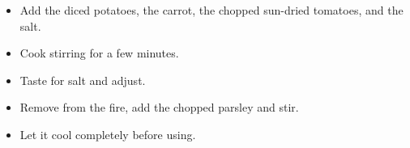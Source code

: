 \documentclass[11pt,letterpaper]{article}
\newcommand \fileName {VeganFilling}
\begin{document}
\begin{description}
\begin{enumerate}
\begin{itemize}
        \item Add the diced potatoes, the carrot, the chopped sun-dried tomatoes, and the salt.
        \item Cook stirring for a few minutes. 
        \item Taste for salt and adjust.
        \item Remove from the fire, add the chopped parsley and stir.
        \item Let it cool completely before using.
        \end{itemize}
  	\end{enumerate}
\end{description}

%
\end{document}
